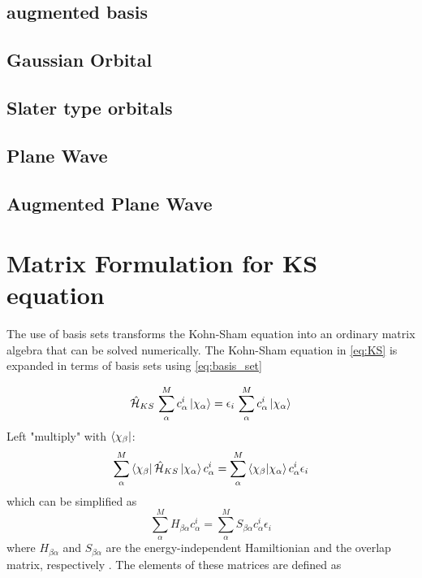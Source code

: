 \subsection{augmented basis}
\subsection{Gaussian Orbital}

    \subsection{Slater type orbitals}
    \subsection{Plane Wave}
    \subsection{Augmented Plane Wave}

\section{Matrix Formulation for KS equation}
The use of basis sets transforms the Kohn-Sham equation into an ordinary matrix algebra  that can be solved numerically. The Kohn-Sham equation in \eqref{eq:KS} is expanded in terms of basis sets using \eqref{eq:basis_set} 

\begin{equation}\label{eq:KS_basis}
	\hat{\mathcal{H}}_{KS}\,  \sum^M_\alpha c^i_\alpha \ket{\chi_\alpha} = \epsilon_i\,  \sum^M_\alpha c^i_\alpha \ket{\chi_\alpha}
\end{equation}
Left "multiply" with  $\bra{\chi_\beta}$:
\begin{equation}
    \sum^M_\alpha  \bra{\chi_\beta} \hat{\mathcal{H}}_{KS} \ket{\chi_\alpha} c^i_\alpha = \sum^M_\alpha \braket{\chi_\beta}{\chi_\alpha} c^i_\alpha \epsilon_i
\end{equation}
which can be simplified as 
\begin{equation}
    \sum^M_\alpha  H_{\beta\alpha} c^i_\alpha = \sum^M_\alpha S_{\beta\alpha} c^i_\alpha \epsilon_i
\end{equation}
where $ H_{\beta\alpha}$ and $S_{\beta\alpha}$ are the energy-independent Hamiltionian and the overlap matrix, respectively \citep{Kohanoff2006}. The elements of these matrices are defined as 

